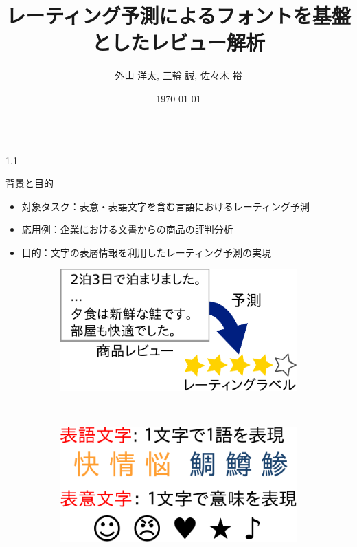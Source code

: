 \documentclass[unicode,10pt]{beamer}
\title{レーティング予測によるフォントを基盤としたレビュー解析}
\institute{豊田工業大学 知能数理研究室}
\author{外山 洋太, 三輪 誠, 佐々木 裕}
\date{\today}
\newlength{\mycolumnwidth}
\begin{document}
\begin{frame}[t]
\vspace{-1em} %

\begin{columns}[onlytextwidth,t]
  \begin{column}{1.1\mycolumnwidth}
    \begin{block}{背景と目的}
      \begin{itemize}
        \item 対象タスク：表意・表語文字を含む言語におけるレーティング予測
        \item 応用例：企業における文書からの商品の評判分析
        \item 目的：文字の表層情報を利用したレーティング予測の実現
      \end{itemize}
    \end{block}
    \begin{figure}
      \begin{subfigure}{0.5\linewidth}
        \includegraphics[width=\linewidth]{fig/review.pdf}
      \end{subfigure}%
      ~
      \begin{subfigure}{0.45\linewidth}
        \includegraphics[width=\linewidth]{fig/logogram_and_ideogram.pdf}
      \end{subfigure}

\end{figure}
\end{column}
\end{columns}
\end{frame}
\end{document}
